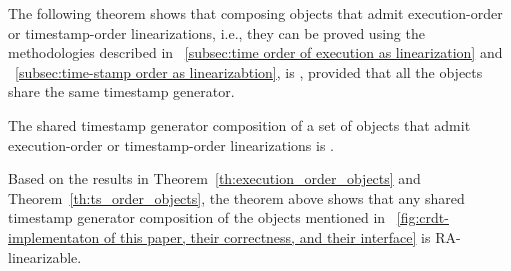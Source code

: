 The following theorem shows that composing \crdtlinearizable{} objects that admit execution-order or timestamp-order linearizations, i.e., they can be proved \crdtlinearizable{} using the methodologies described in \sectionautorefname~\ref{subsec:time order of execution as linearization} and \sectionautorefname~\ref{subsec:time-stamp order as linearizabtion}, is \crdtlinearizable{}, provided that all the objects share the same timestamp generator.

\begin{theorem}\label{th:comp_all}
The shared timestamp generator composition of a set of \crdtlinearizable{} objects that admit execution-order or timestamp-order linearizations is \crdtlinearizable{}.
\end{theorem}

Based on the results in Theorem~\ref{th:execution_order_objects} and Theorem~\ref{th:ts_order_objects}, the theorem above shows that any shared timestamp generator composition of the objects mentioned in \figureautorefname~\ref{fig:crdt-implementaton of this paper, their correctness, and their interface} is RA-linearizable.

% 

